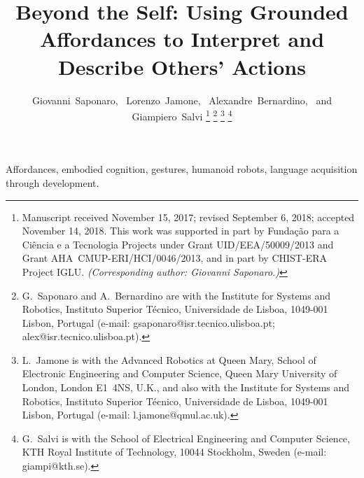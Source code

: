 \documentclass[journal]{IEEEtran}
\begin{document}
\title{Beyond the Self: Using Grounded Affordances to Interpret and Describe Others' Actions}

\author{Giovanni~Saponaro,~
        Lorenzo~Jamone,~
        Alexandre~Bernardino,~ and
        Giampiero~Salvi
        \thanks{
          Manuscript received November 15, 2017; revised September 6, 2018; accepted November 14, 2018.
          This work was supported in part by Fundação para a Ciência e a Tecnologia Projects under Grant UID/EEA/50009/2013 and Grant AHA~CMUP-ERI/HCI/0046/2013, and in part by CHIST-ERA Project IGLU.
          \emph{(Corresponding author: Giovanni Saponaro.)}}
\thanks{G.~Saponaro and A.~Bernardino are with the
Institute for Systems and Robotics,
Instituto Superior Técnico,
Universidade de Lisboa,
1049-001 Lisbon, Portugal
(e-mail: gsaponaro@isr.tecnico.ulisboa.pt; alex@isr.tecnico.ulisboa.pt).}
\thanks{L.~Jamone is with the
Advanced Robotics at Queen Mary,
School of Electronic Engineering and Computer Science,
Queen Mary University of London,
London E1~4NS, U.K.,
and also with the
Institute for Systems and Robotics,
Instituto Superior Técnico,
Universidade de Lisboa,
1049-001 Lisbon, Portugal
(e-mail: l.jamone@qmul.ac.uk).}
\thanks{G.~Salvi is with the
School of Electrical Engineering and Computer Science,
KTH Royal Institute of Technology,
10044 Stockholm, Sweden
(e-mail: giampi@kth.se).}
}

\maketitle
\IEEEpeerreviewmaketitle

\begin{abstract}
  
\end{abstract}

\begin{IEEEkeywords}
Affordances, embodied cognition, gestures, humanoid robots, language acquisition through development.
\end{IEEEkeywords}






\end{document}
